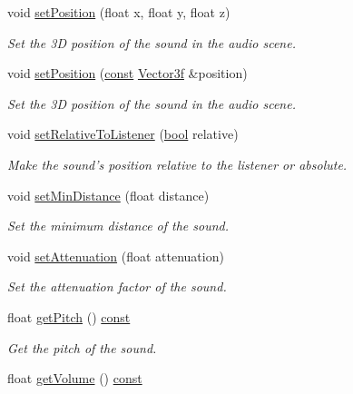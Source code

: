 \begin{DoxyCompactItemize}
void \hyperlink{classsf_1_1_sound_source_a0480257ea25d986eba6cc3c1a6f8d7c2}{set\-Position} (float x, float y, float z)
\begin{DoxyCompactList}\small\item\em Set the 3\-D position of the sound in the audio scene. \end{DoxyCompactList}\item 
void \hyperlink{classsf_1_1_sound_source_a17ba9ed01925395652181a7b2a7d3aef}{set\-Position} (\hyperlink{term__entry_8h_a57bd63ce7f9a353488880e3de6692d5a}{const} \hyperlink{namespacesf_a36e44d9e6d8f649703698ec9d24ac052}{Vector3f} \&position)
\begin{DoxyCompactList}\small\item\em Set the 3\-D position of the sound in the audio scene. \end{DoxyCompactList}\item 
void \hyperlink{classsf_1_1_sound_source_ac478a8b813faf7dd575635b102081d0d}{set\-Relative\-To\-Listener} (\hyperlink{term__entry_8h_a002004ba5d663f149f6c38064926abac}{bool} relative)
\begin{DoxyCompactList}\small\item\em Make the sound's position relative to the listener or absolute. \end{DoxyCompactList}\item 
void \hyperlink{classsf_1_1_sound_source_a75bbc2c34addc8b25a14edb908508afe}{set\-Min\-Distance} (float distance)
\begin{DoxyCompactList}\small\item\em Set the minimum distance of the sound. \end{DoxyCompactList}\item 
void \hyperlink{classsf_1_1_sound_source_aa2adff44cd2f8b4e3c7315d7c2a45626}{set\-Attenuation} (float attenuation)
\begin{DoxyCompactList}\small\item\em Set the attenuation factor of the sound. \end{DoxyCompactList}\item 
float \hyperlink{classsf_1_1_sound_source_aedad6aff442aeb6dcd267befd4fdbb59}{get\-Pitch} () \hyperlink{term__entry_8h_a57bd63ce7f9a353488880e3de6692d5a}{const} 
\begin{DoxyCompactList}\small\item\em Get the pitch of the sound. \end{DoxyCompactList}\item 
float \hyperlink{classsf_1_1_sound_source_aafb0558fce9cbebfc6828d932cbcce2f}{get\-Volume} () \hyperlink{term__entry_8h_a57bd63ce7f9a353488880e3de6692d5a}{const} 

\end{DoxyCompactItemize}
